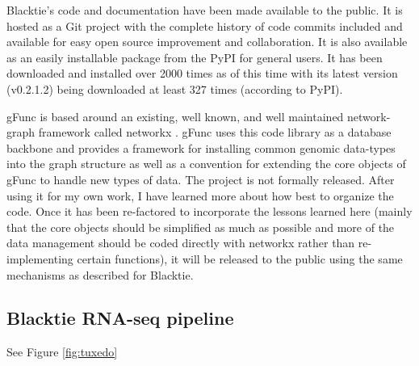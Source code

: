 Blacktie's code and documentation have been made available to the public.
It is hosted as a \gls{Git} project with the complete history of code commits included and available for easy open source improvement and collaboration.
It is also available as an easily installable package from the \gls{PyPI} for general users.
It has been downloaded and installed over 2000 times as of this time with its latest version (v0.2.1.2) being downloaded at least 327 times (according to \gls{PyPI}).

\gls{gFunc} is based around an existing, well known, and well maintained network-graph framework called networkx \cite{Hagberg2008}.
\gls{gFunc} uses this code library as a database backbone and provides a framework for installing common genomic data-types into the graph structure as well as a convention for extending the core objects of \gls{gFunc} to handle new types of data.
The project is not formally released.
After using it for my own work, I have learned more about how best to organize the code.
Once it has been re-factored to incorporate the lessons learned here (mainly that the core objects should be simplified as much as possible and more of the data management should be coded directly with networkx rather than re-implementing certain functions), it will be released to the public using the same mechanisms as described for Blacktie.


\subsection{Blacktie RNA-seq pipeline}

See Figure \ref{fig:tuxedo}







